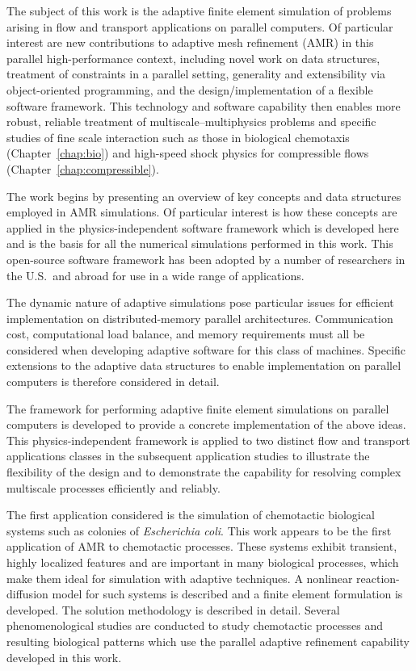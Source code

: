 The subject of this work is the adaptive finite element simulation of  problems arising in flow and transport applications on parallel computers. Of particular interest are new contributions to adaptive mesh refinement (AMR) in this parallel high-performance context, including novel work on data structures, treatment of constraints in a parallel setting, generality and extensibility via object-oriented programming, and the design/implementation of a flexible software framework.  This technology and software capability then enables more robust, reliable treatment of multiscale--multiphysics problems and specific studies of fine scale interaction such as those in biological chemotaxis (Chapter~\ref{chap:bio}) and high-speed shock physics for compressible flows (Chapter~\ref{chap:compressible}).

The work begins by presenting an overview of key concepts and data structures employed in AMR simulations.  Of particular interest is how these concepts are applied in the physics-independent software framework which is developed here and is the basis for all the numerical simulations performed in this work.  This open-source software framework has been adopted by a number of researchers in the U.S.\ and abroad for use in a wide range of applications.

The dynamic nature of adaptive simulations pose particular issues for efficient implementation on distributed-memory parallel architectures. Communication cost, computational load balance, and memory requirements must all be considered when developing adaptive software for this class of machines.  Specific extensions to the adaptive data structures to enable implementation on parallel computers is therefore considered in detail.

The \libMesh{} framework for performing adaptive finite element simulations on parallel computers is developed to provide a concrete implementation of the above ideas.  This physics-independent framework is applied to two distinct flow and transport applications classes in the subsequent application studies to illustrate the flexibility of the design and to demonstrate the capability for resolving complex multiscale processes efficiently and reliably.

The first application considered is the simulation of chemotactic biological systems such as colonies of \emph{Escherichia coli}. This work appears to be the first application of AMR to chemotactic processes. These systems exhibit transient, highly localized features and are important in many biological processes, which make them ideal for simulation with adaptive techniques.  A nonlinear reaction-diffusion model for such systems is described and a finite element formulation is developed.  The solution methodology is described in detail.  Several phenomenological studies are conducted to study chemotactic processes and resulting biological patterns which use the parallel adaptive refinement capability developed in this work. 

